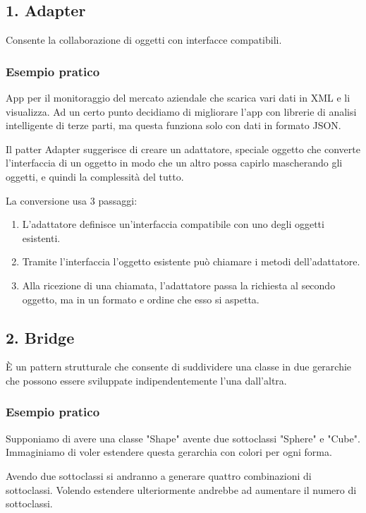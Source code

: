\documentclass{report}
\begin{document}
\subsection*{1. Adapter}
Consente la collaborazione di oggetti con interfacce compatibili.

\subsubsection*{Esempio pratico}
App per il monitoraggio del mercato aziendale che scarica vari dati in XML e li visualizza. Ad un certo punto decidiamo di migliorare l'app con librerie di analisi intelligente di terze parti, ma questa funziona solo con dati in formato JSON.

\smallskip
\noindent
Il patter Adapter suggerisce di creare un adattatore, speciale oggetto che converte l'interfaccia di un oggetto in modo che un altro possa capirlo mascherando gli oggetti, e quindi la complessità del tutto.

\noindent
La conversione usa 3 passaggi:
\begin{enumerate}
    \item L'adattatore definisce un'interfaccia compatibile con uno degli oggetti esistenti.
    \item Tramite l'interfaccia l'oggetto esistente può chiamare i metodi dell'adattatore.
    \item Alla ricezione di una chiamata, l'adattatore passa la richiesta al secondo oggetto, ma in un formato e ordine che esso si aspetta.
\end{enumerate}

\newpage
\subsection*{2. Bridge}
\`E un pattern strutturale che consente di suddividere una classe in due gerarchie che possono essere sviluppate indipendentemente l'una dall'altra.

\subsubsection*{Esempio pratico}
Supponiamo di avere una classe "Shape" avente due sottoclassi "Sphere" e "Cube". Immaginiamo di voler estendere questa gerarchia con colori per ogni forma.

\noindent
Avendo due sottoclassi si andranno a generare quattro combinazioni di sottoclassi. Volendo estendere ulteriormente andrebbe ad aumentare il numero di sottoclassi.
\end{document}
